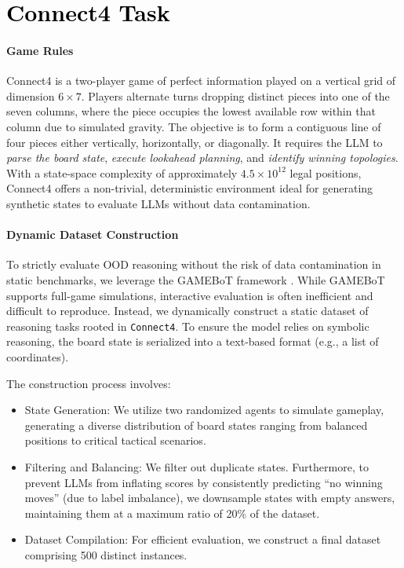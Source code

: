 \documentclass{article}
\newcommand{\modify}[1]{\textcolor{black}{#1}} %
\theoremstyle{plain}
\theoremstyle{definition}
\theoremstyle{remark}
\begin{document}
\section{\modify{Connect4 Task}}
\label{appd:connect4}
\paragraph{Game Rules}
Connect4 is a two-player game of perfect information played on a vertical grid of dimension $6 \times 7$. Players alternate turns dropping distinct pieces into one of the seven columns, where the piece occupies the lowest available row within that column due to simulated gravity. The objective is to form a contiguous line of four pieces either vertically, horizontally, or diagonally. It requires the LLM to \textit{parse the board state}, \textit{execute lookahead planning}, and \textit{identify winning topologies}. With a state-space complexity of approximately $4.5 \times 10^{12}$ legal positions, Connect4 offers a non-trivial, deterministic environment ideal for generating synthetic states to evaluate LLMs without data contamination.
\paragraph{Dynamic Dataset Construction}
To strictly evaluate OOD reasoning without the risk of data contamination in static benchmarks, we leverage the GAMEBoT framework \cite{lin2025gamebot}. While GAMEBoT supports full-game simulations, interactive evaluation is often inefficient and difficult to reproduce. Instead, we dynamically construct a static dataset of reasoning tasks rooted in \texttt{Connect4}. To ensure the model relies on symbolic reasoning, the board state is serialized into a text-based format (e.g., a list of coordinates).

The construction process involves:
\begin{itemize}

\item State Generation: We utilize two randomized agents to simulate gameplay, generating a diverse distribution of board states ranging from balanced positions to critical tactical scenarios.
\item Filtering and Balancing: We filter out duplicate states. Furthermore, to prevent LLMs from inflating scores by consistently predicting ``no winning moves'' (due to label imbalance), we downsample states with empty answers, maintaining them at a maximum ratio of 20\% of the dataset.
\item Dataset Compilation: For efficient evaluation, we construct a final dataset comprising 500 distinct instances.
\end{itemize}
\end{document}
